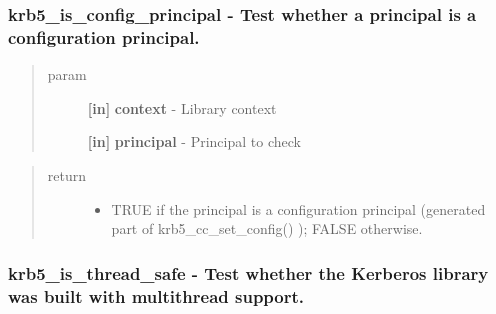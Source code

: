 \documentclass[letterpaper,10pt,english]{sphinxmanual}
\begin{document}
\subsubsection{krb5\_is\_config\_principal -  Test whether a principal is a configuration principal.}
\label{appdev/refs/api/krb5_is_config_principal:krb5-is-config-principal-test-whether-a-principal-is-a-configuration-principal}\label{appdev/refs/api/krb5_is_config_principal::doc}

\begin{fulllineitems}
\label{appdev/refs/api/krb5_is_config_principal:c.krb5_is_config_principal}
\end{fulllineitems}

\begin{quote}\begin{description}
\item[{param}] \leavevmode
\textbf{{[}in{]}} \textbf{context} - Library context

\textbf{{[}in{]}} \textbf{principal} - Principal to check

\end{description}\end{quote}
\begin{quote}\begin{description}
\item[{return}] \leavevmode\begin{itemize}
\item {} 
TRUE if the principal is a configuration principal (generated part of krb5\_cc\_set\_config() ); FALSE otherwise.

\end{itemize}

\end{description}\end{quote}


\subsubsection{krb5\_is\_thread\_safe -  Test whether the Kerberos library was built with multithread support.}
\label{appdev/refs/api/krb5_is_thread_safe::doc}\label{appdev/refs/api/krb5_is_thread_safe:krb5-is-thread-safe-test-whether-the-kerberos-library-was-built-with-multithread-support}
\end{document}
